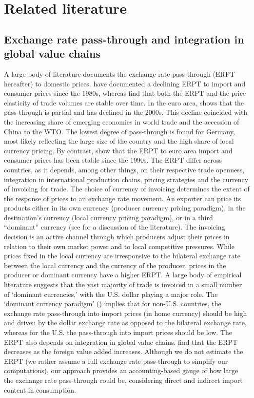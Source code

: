 \documentclass[12pt,a4paper]{paper}
\begin{document}
\label{sec:intro}


\section{Related literature}
\label{sec:lit}

\subsection{Exchange rate pass-through and integration in global value chains} 
A large body of literature documents the exchange rate pass-through (ERPT hereafter) to domestic prices. 
\cite{Campa2008} have documented a declining ERPT to import and consumer prices since the 1980s, whereas \cite{Leigh2017} find that both the ERPT and the price elasticity of trade volumes are stable over time. 
In the euro area, \cite{Ozyurt2016} shows that the pass-through is partial and has declined in the 2000s. 
This decline coincided with the increasing share of emerging economies in world trade and the accession of China to the WTO. 
The lowest degree of pass-through is found for Germany, most likely reflecting the large size of the country and the high share of local currency pricing.
By contrast, \cite{Ortega2020} show that the ERPT to euro area import and consumer prices has been stable since the 1990s. 
The ERPT differ across countries, as it depends, among other things, on their respective trade openness, integration in international production chains, pricing strategies and the currency of invoicing for trade. 
The choice of currency of invoicing determines the extent of the response of prices to an exchange rate movement. 
An exporter can price its products either in its own currency (producer currency pricing paradigm), in the destination’s currency (local currency pricing paradigm), or in a third “dominant” currency (see \cite{Ortega2020} for a discussion of the literature). 
The invoicing decision is an active channel through which producers adjust their prices in relation to their own market power and to local competitive pressures.
While prices fixed in the local currency are irresponsive to the bilateral exchange rate between the local currency and the currency of the
producer, prices in the producer or dominant currency have a higher ERPT.
A large body of empirical literature suggests that the vast majority of trade is invoiced in a small number of ‘dominant currencies,’ with the U.S. dollar playing a major role. 
The ‘dominant currency paradigm’ (\cite{Gopinath2020}) implies that for non-U.S. countries, the exchange rate pass-through into import prices (in home currency) should be high and driven by the dollar exchange rate as opposed to the bilateral exchange rate, whereas for the U.S. the pass-through into import prices should be low.
The ERPT also depends on integration in global value chains. 
\cite{DeSoyres2018} find that the ERPT decreases as the foreign value added increases.
Although we do not estimate the ERPT (we rather assume a full exchange rate pass-through to simplify our computations), our approach provides an accounting-based gauge of how large the exchange rate pass-through could be, considering direct and indirect import content in consumption.\\
\end{document}
